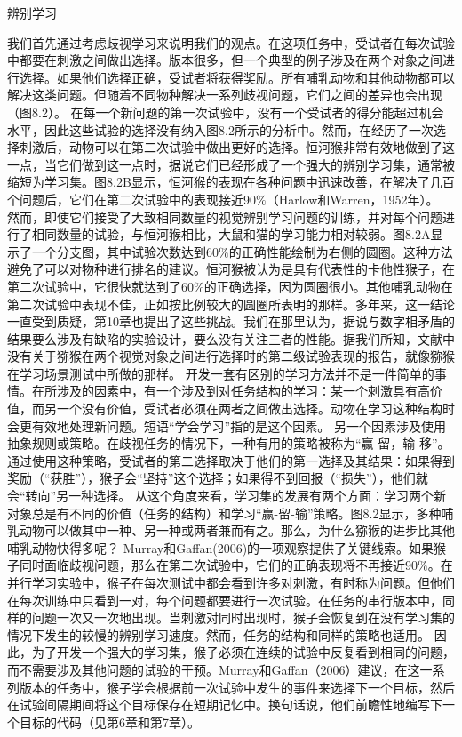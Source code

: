 辨别学习

我们首先通过考虑歧视学习来说明我们的观点。在这项任务中，受试者在每次试验中都要在刺激之间做出选择。版本很多，但一个典型的例子涉及在两个对象之间进行选择。如果他们选择正确，受试者将获得奖励。所有哺乳动物和其他动物都可以解决这类问题。但随着不同物种解决一系列歧视问题，它们之间的差异也会出现（图8.2）。
在每一个新问题的第一次试验中，没有一个受试者的得分能超过机会水平，因此这些试验的选择没有纳入图8.2所示的分析中。然而，在经历了一次选择刺激后，动物可以在第二次试验中做出更好的选择。恒河猴非常有效地做到了这一点，当它们做到这一点时，据说它们已经形成了一个强大的辨别学习集，通常被缩短为学习集。图8.2B显示，恒河猴的表现在各种问题中迅速改善，在解决了几百个问题后，它们在第二次试验中的表现接近90$\%$（Harlow和Warren，1952年）。
然而，即使它们接受了大致相同数量的视觉辨别学习问题的训练，并对每个问题进行了相同数量的试验，与恒河猴相比，大鼠和猫的学习能力相对较弱。图8.2A显示了一个分支图，其中试验次数达到60$\%$的正确性能绘制为右侧的圆圈。这种方法避免了可以对物种进行排名的建议。恒河猴被认为是具有代表性的卡他性猴子，在第二次试验中，它很快就达到了60$\%$的正确选择，因为圆圈很小。其他哺乳动物在第二次试验中表现不佳，正如按比例较大的圆圈所表明的那样。多年来，这一结论一直受到质疑，第10章也提出了这些挑战。我们在那里认为，据说与数字相矛盾的结果要么涉及有缺陷的实验设计，要么没有关注三者的性能。据我们所知，文献中没有关于猕猴在两个视觉对象之间进行选择时的第二级试验表现的报告，就像猕猴在学习场景测试中所做的那样。
开发一套有区别的学习方法并不是一件简单的事情。在所涉及的因素中，有一个涉及到对任务结构的学习：某一个刺激具有高价值，而另一个没有价值，受试者必须在两者之间做出选择。动物在学习这种结构时会更有效地处理新问题。短语“学会学习”指的是这个因素。
另一个因素涉及使用抽象规则或策略。在歧视任务的情况下，一种有用的策略被称为“赢-留，输-移”。通过使用这种策略，受试者的第二选择取决于他们的第一选择及其结果：如果得到奖励（“获胜”），猴子会“坚持”这个选择；如果得不到回报（“损失”），他们就会“转向”另一种选择。
从这个角度来看，学习集的发展有两个方面：学习两个新对象总是有不同的价值（任务的结构）和学习“赢-留-输”策略。图8.2显示，多种哺乳动物可以做其中一种、另一种或两者兼而有之。那么，为什么猕猴的进步比其他哺乳动物快得多呢？
Murray和Gaffan(2006)的一项观察提供了关键线索。如果猴子同时面临歧视问题，那么在第二次试验中，它们的正确表现将不再接近90$\%$。在并行学习实验中，猴子在每次测试中都会看到许多对刺激，有时称为问题。但他们在每次训练中只看到一对，每个问题都要进行一次试验。在任务的串行版本中，同样的问题一次又一次地出现。当刺激对同时出现时，猴子会恢复到在没有学习集的情况下发生的较慢的辨别学习速度。然而，任务的结构和同样的策略也适用。
因此，为了开发一个强大的学习集，猴子必须在连续的试验中反复看到相同的问题，而不需要涉及其他问题的试验的干预。Murray和Gaffan（2006）建议，在这一系列版本的任务中，猴子学会根据前一次试验中发生的事件来选择下一个目标，然后在试验间隔期间将这个目标保存在短期记忆中。换句话说，他们前瞻性地编写下一个目标的代码（见第6章和第7章）。
